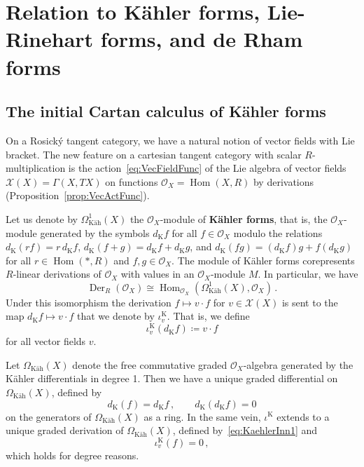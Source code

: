 \documentclass[12pt,reqno, a4paper]{amsart}
\numberwithin{equation}{section}
\theoremstyle{plain}
\theoremstyle{definition}
\theoremstyle{remark}
\DeclareMathOperator{\Der}{Der}
\DeclareMathOperator{\Hom}{Hom}
\newcommand{\calO}{\mathcal{O}}
\newcommand{\calX}{\mathcal{X}}
\begin{document}
\section{Relation to K\"ahler forms, Lie-Rinehart forms, and de Rham forms}

\label{sec:Comparison}

\subsection{The initial Cartan calculus of K\"ahler forms}

On a Rosick\'y tangent category, we have a natural notion of vector fields with Lie bracket. The new feature on a cartesian tangent category with scalar $R$-multiplication is the action~\eqref{eq:VecFieldFunc} of the Lie algebra of vector fields $\calX(X) = \Gamma(X,TX)$ on functions $\calO_X = \Hom(X,R)$ by derivations (Proposition~\ref{prop:VecActFunc}).

Let us denote by $\Omega^1_\text{K\"ah}(X)$ the $\calO_X$-module of \textbf{K\"ahler forms}, that is, the $\calO_X$-module generated by the symbols $d_\mathrm{K}f$ for all $f \in \calO_X$ modulo the relations $d_\mathrm{K}(rf) = r\, d_\mathrm{K}f$, $d_\mathrm{K}(f + g) = d_\mathrm{K}f + d_\mathrm{K}g$, and $d_\mathrm{K}(fg) = (d_\mathrm{K}f) g + f(d_\mathrm{K}g)$ for all $r \in \Hom(*,R)$ and $f,g \in \calO_X$. The module of K\"ahler forms corepresents $R$-linear derivations of $\calO_X$ with values in an $\calO_X$-module $M$. In particular, we have
\begin{equation*}
  \Der_R(\calO_X) \cong \Hom_{\calO_X}(\Omega^1_\text{K\"ah}(X), \calO_X)
  \,.
\end{equation*}
Under this isomorphism the derivation $f \mapsto v\cdot f$ for $v \in \calX(X)$ is sent to the map $d_\mathrm{K}f \mapsto v\cdot f$ that we denote by $\iota^\mathrm{K}_v$. That is, we define
\begin{equation}
\label{eq:KaehlerInn1}
  \iota^\mathrm{K}_v (d_\mathrm{K}f)
  \coloneqq v \cdot f
\end{equation}
for all vector fields $v$.

Let $\Omega_\text{K\"ah}(X)$ denote the free commutative graded $\calO_X$-algebra generated by the K\"ahler differentials in degree 1. Then we have a unique graded differential on $\Omega_\text{K\"ah}(X)$, defined by
\begin{equation}
\label{eq:KaehlerDiff}
  d_\mathrm{K}(f) = d_\mathrm{K}f
  \,,\qquad
  d_\mathrm{K}(d_\mathrm{K}f) = 0
\end{equation}
on the generators of $\Omega_\text{K\"ah}(X)$ as a ring. In the same vein, $\iota^\mathrm{K}$ extends to a unique graded derivation of $\Omega_\text{K\"ah}(X)$, defined by~\eqref{eq:KaehlerInn1} and
\begin{equation}
\label{eq:KaehlerInn2}
  \iota^\mathrm{K}_v(f) = 0
  \,,
\end{equation}
which holds for degree reasons.
\end{document}
